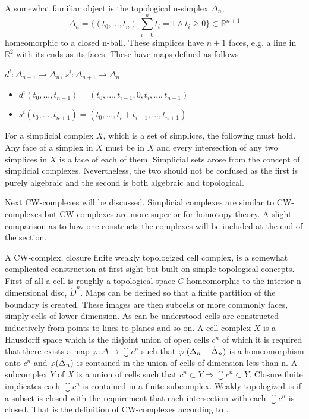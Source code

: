 \documentclass[../../main.tex]{subfiles}
\begin{document}
    A somewhat familiar object is the topological n-simplex $\Delta_n$,
    \begin{equation}
        \Delta_n = \{(t_0, . . . , t_n)  |\sum_{i=0}^{n}t_i=1 \wedge t_i \geq 0\} \subset \mathbb{R}^{n+1}
    \end{equation}
    homeomorphic to a closed n-ball. These simplices have $n+1$ faces, e.g. a line in $\mathbb{R}^2$ with its ends as its faces. These have maps defined as follows
    
    \begin{definition}\label{simp-map}
        $d^i:\Delta_{n-1}\to \Delta_n$, $s^i:\Delta_{n+1}\to \Delta_n$
        \begin{itemize}
           \item $d^i(t_0,...,t_{n-1})=(t_0,...,t_{i-1},0,t_i,...,t_{n-1})$
           \item $s^i(t_0,...,t_{n+1})=(t_0,...,t_i+t_{i+1},...,t_{n+1})$
        \end{itemize}
    \end{definition}
    
    For a simplicial complex $X$, which is a set of simplices, the following must hold. Any face of a simplex in $X$ must be in $X$ and every intersection of any two simplices in $X$ is a face of each of them. Simplicial sets arose from the concept of simplicial complexes. Nevertheless, the two should not be confused as the first is purely algebraic and the second is both algebraic and topological.
    
    Next CW-complexes will be discussed. Simplicial complexes are similar to CW-complexes but CW-complexes are more superior for homotopy theory. A slight comparison as to how one constructs the complexes will be included at the end of the section. 
    
    A CW-complex, closure finite weakly topologized cell complex, is a somewhat complicated construction at first sight but built on simple topological concepts. First of all a cell is roughly a topological space $C$ homeomorphic to the interior n-dimensional disc, $\mathring{D}^n$. Maps can be defined so that a finite partition of the boundary is created. These images are then subcells or more commonly faces, simply cells of lower dimension. As can be understood cells are constructed inductively from points to lines to planes and so on. A cell complex $X$ is a Hausdorff space which is the disjoint union of open cells $c^n$ of which it is required that there exists a map $\varphi:\Delta\to\closure{c}^n$ such that $\varphi|(\Delta_n - \dot{\Delta}_n )$ is a homeomorphism onto $c^n$ and $\varphi(\dot{\Delta}_n)$ is contained in the union of cells of dimension less than n. A subcomplex $Y$ of $X$ is a union of cells such that $c^n\subset Y \Rightarrow \closure{c}^n\subset Y$. Closure finite implicates each $\closure{c}^n$ is contained in a finite subcomplex. Weakly topologized is if a subset is closed with the requirement that each intersection with each $\closure{c}^n$ is closed. That is the definition of CW-complexes according to \cite{simp-may}.
    
\end{document}
